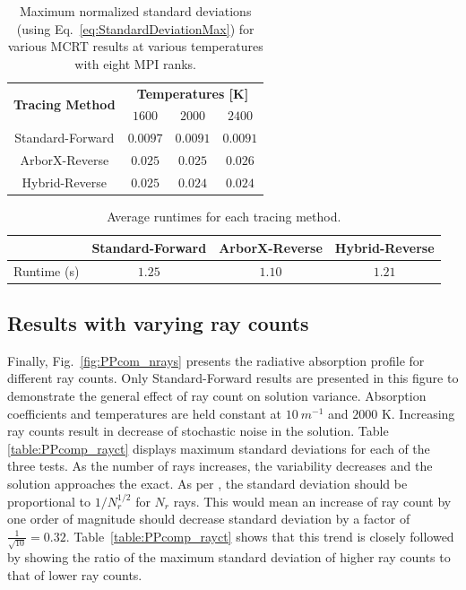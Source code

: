 \begin{table}
\centering
\caption{Maximum normalized standard deviations (using Eq.~\ref{eq:StandardDeviationMax}) for various MCRT results at various temperatures with eight MPI ranks.}
\begin{tabular}{c c c c} 
\hline
\multirow{ 2}{*}{\bfseries Tracing Method} & 
\multicolumn{3}{c}{\bfseries Temperatures [K]} \\ [0.5ex] \cline{2-4}
 & $1600$ & $2000$ & $2400$ \\ [0.5ex]
 \hline
 Standard-Forward & $0.0097$ & $0.0091$ & $0.0091$ \\ [0.5ex] 
 ArborX-Reverse & $0.025$ & $0.025$ & $0.026$ \\ [0.5ex] 
 Hybrid-Reverse & $0.025$ & $0.024$ & $0.024$ \\ [0.5ex] 
 \hline
\end{tabular}
\label{table:PPcomp_temp_mpi}
\end{table}

\begin{table}
\centering
\caption{Average runtimes for each tracing method.}
\begin{tabular}{c c c c} 
\hline
 & Standard-Forward & ArborX-Reverse & Hybrid-Reverse \\ [0.5ex]
 \hline
 Runtime (s) & $1.25$ & $1.10$ & $1.21$ \\ [0.5ex] 
 \hline
\end{tabular}
\label{table:PP_runtimes_mpi}
\end{table}



\subsection{Results with varying ray counts}
Finally, Fig.~\ref{fig:PPcom_nrays} presents the radiative absorption profile for different ray counts. Only Standard-Forward results are presented in this figure to demonstrate the general effect of ray count on solution variance. Absorption coefficients and temperatures are held constant at $10~m^{-1}$ and $2000$ K.
Increasing ray counts result in decrease of stochastic noise in the solution. Table \ref{table:PPcomp_rayct} displays maximum standard deviations for each of the three tests. As the number of rays increases, the variability decreases and the solution approaches the exact. As per \citet{Modest2022ChapterExchange}, the standard deviation should be proportional to $1/N_r^{1/2}$ for $N_r$ rays. This would mean an increase of ray count by one order of magnitude should decrease standard deviation by a factor of $\frac{1}{\sqrt{10}} = 0.32$. Table~\ref{table:PPcomp_rayct} shows that this trend is closely followed by showing the ratio of the maximum standard deviation of higher ray counts to that of lower ray counts.


